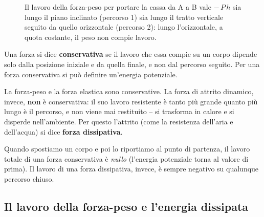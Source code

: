 \begin{figure}[!htbp]
    \centering
    \caption{Il lavoro della forza-peso per portare la cassa da A a B vale $-\,P\,h$ sia lungo il piano inclinato (percorso 1) sia lungo il tratto verticale seguito da quello orizzontale (percorso 2): lungo l'orizzontale, a quota costante, il peso non compie lavoro.}
    \label{fig:conservativa}
\end{figure}

\begin{definizione}
Una forza si dice \textbf{conservativa} se il lavoro che essa compie su un corpo dipende solo dalla posizione iniziale e da quella finale, e non dal percorso seguito. Per una forza conservativa si può definire un'energia potenziale.
\end{definizione}

La forza-peso e la forza elastica sono conservative. La forza di attrito dinamico, invece, \textbf{non} è conservativa: il suo lavoro resistente è tanto più grande quanto più lungo è il percorso, e non viene mai restituito -- si trasforma in calore e si disperde nell'ambiente. Per questo l'attrito (come la resistenza dell'aria e dell'acqua) si dice \textbf{forza dissipativa}.

\begin{remark}
Quando spostiamo un corpo e poi lo riportiamo al punto di partenza, il lavoro totale di una forza conservativa è \emph{nullo} (l'energia potenziale torna al valore di prima). Il lavoro di una forza dissipativa, invece, è sempre negativo su qualunque percorso chiuso.
\end{remark}

\subsection{Il lavoro della forza-peso e l'energia dissipata}

